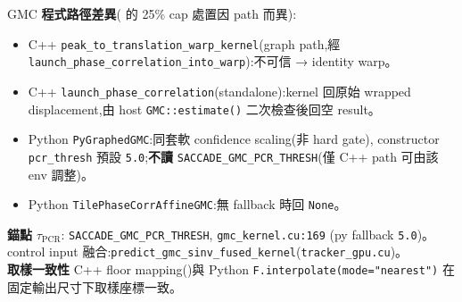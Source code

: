 \begin{implsupp}{GMC}
\textbf{程式路徑差異}( 的 25\% cap 處置因 path 而異):
\begin{itemize}\setlength\itemsep{1pt}
  \item C++ \texttt{peak\_to\_translation\_warp\_kernel}(graph path,經
        \texttt{launch\_phase\_correlation\_into\_warp}):不可信 → identity warp。
  \item C++ \texttt{launch\_phase\_correlation}(standalone):kernel 回原始
        wrapped displacement,由 host \texttt{GMC::estimate()} 二次檢查後回空 result。
  \item Python \texttt{PyGraphedGMC}:同套軟 confidence scaling(非 hard gate),
        constructor \texttt{pcr\_thresh} 預設 \texttt{5.0};\textbf{不讀}
        \texttt{SACCADE\_GMC\_PCR\_THRESH}(僅 C++ path 可由該 env 調整)。
  \item Python \texttt{TilePhaseCorrAffineGMC}:無 fallback 時回 \texttt{None}。
\end{itemize}

\textbf{錨點}\;\;
\(\tau_{\mathrm{PCR}}\): \texttt{SACCADE\_GMC\_PCR\_THRESH}, \texttt{gmc\_kernel.cu:169}
(py fallback \texttt{5.0})。\quad
control input 融合:\texttt{predict\_gmc\_sinv\_fused\_kernel}(\texttt{tracker\_gpu.cu})。\\
\textbf{取樣一致性}\;\; C++ floor mapping()與 Python
\texttt{F.interpolate(mode="nearest")} 在固定輸出尺寸下取樣座標一致。
\end{implsupp}
